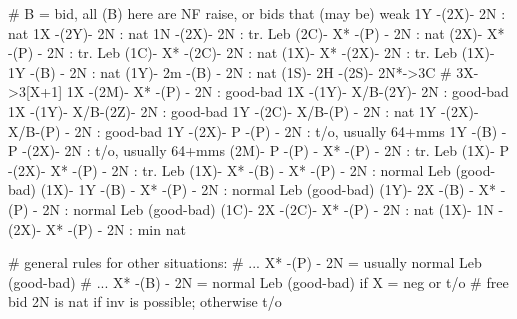 # B = bid, all (B) here are NF raise, or bids that (may be) weak
 1Y -(2X)- 2N : nat
 1X -(2Y)- 2N : nat
 1N -(2X)- 2N : tr. Leb
(2C)- X* -(P) - 2N : nat
(2X)- X* -(P) - 2N : tr. Leb
(1C)- X* -(2C)- 2N : nat
(1X)- X* -(2X)- 2N : tr. Leb 
(1X)- 1Y -(B) - 2N : nat
(1Y)- 2m -(B) - 2N : nat
(1S)- 2H -(2S)- 2N*->3C # 3X->3[X+1]
 1X -(2M)- X* -(P) - 2N : good-bad
 1X -(1Y)- X/B-(2Y)- 2N : good-bad
 1X -(1Y)- X/B-(2Z)- 2N : good-bad 
 1Y -(2C)- X/B-(P) - 2N : nat 
 1Y -(2X)- X/B-(P) - 2N : good-bad
 1Y -(2X)- P  -(P) - 2N : t/o, usually 64+mms
 1Y -(B) - P  -(2X)- 2N : t/o, usually 64+mms
(2M)- P  -(P) - X* -(P) - 2N : tr. Leb
(1X)- P  -(2X)- X* -(P) - 2N : tr. Leb
(1X)- X* -(B) - X* -(P) - 2N : normal Leb (good-bad)
(1X)- 1Y -(B) - X* -(P) - 2N : normal Leb (good-bad)
(1Y)- 2X -(B) - X* -(P) - 2N : normal Leb (good-bad)
(1C)- 2X -(2C)- X* -(P) - 2N : nat
(1X)- 1N -(2X)- X* -(P) - 2N : min nat

# general rules for other situations: 
# ... X* -(P) - 2N = usually normal Leb (good-bad)
# ... X* -(B) - 2N = normal Leb (good-bad) if X = neg or t/o
# free bid 2N is nat if inv is possible; otherwise t/o